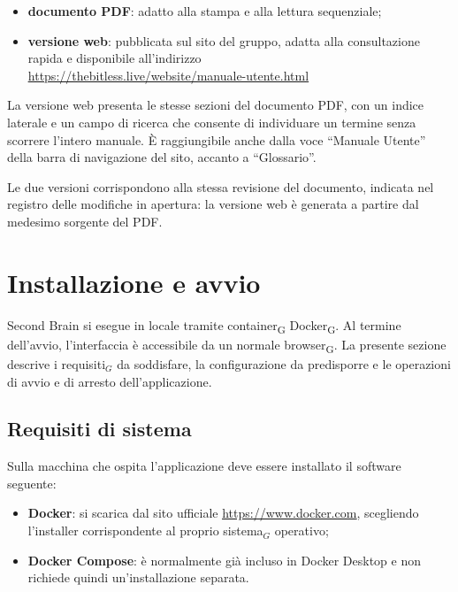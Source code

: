 \documentclass[a4paper, 10pt]{article}
\newcommand{\link}[1]{\uline{\url{#1}}}
\newcommand{\linklungo}[1]{{\footnotesize\uline{\url{#1}}}}
\begin{document}
\begin{itemize}
    \item \textbf{documento PDF}: adatto alla stampa e alla lettura sequenziale;

    \item \textbf{versione web}: pubblicata sul sito del gruppo, adatta alla consultazione rapida e disponibile all'indirizzo \\
    \linklungo{https://thebitless.live/website/manuale-utente.html}
\end{itemize}

La versione web presenta le stesse sezioni del documento PDF, con un indice laterale e un campo di ricerca che consente di individuare un termine senza scorrere l'intero manuale. È raggiungibile anche dalla voce ``Manuale Utente'' della barra di navigazione del sito, accanto a ``Glossario''.

Le due versioni corrispondono alla stessa revisione del documento, indicata nel registro delle modifiche in apertura: la versione web è generata a partire dal medesimo sorgente del PDF.


\section{Installazione e avvio}
\label{sec:installazione-avvio}
Second Brain si esegue in locale tramite container\textsubscript{G} Docker\textsubscript{G}. Al termine dell'avvio, l'interfaccia è accessibile da un normale browser\textsubscript{G}. La presente sezione descrive i requisiti$_G$ da soddisfare, la configurazione da predisporre e le operazioni di avvio e di arresto dell'applicazione.

\subsection{Requisiti di sistema}
\label{sec:requisiti-sistema}
Sulla macchina che ospita l'applicazione deve essere installato il software seguente:

\begin{itemize}
    \item \textbf{Docker}: si scarica dal sito ufficiale \link{https://www.docker.com}, scegliendo l'installer corrispondente al proprio sistema$_G$ operativo;

    \item \textbf{Docker Compose}: è normalmente già incluso in Docker Desktop e non richiede quindi un'installazione separata.
\end{itemize}
\end{document}
